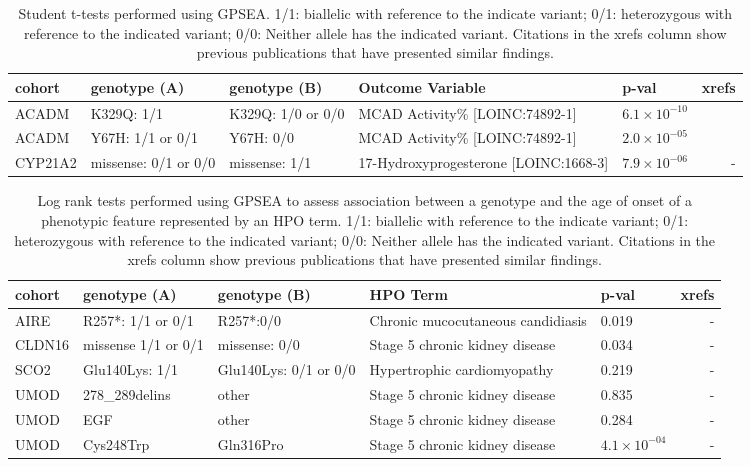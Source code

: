 \documentclass[12pt]{article}
\begin{document}
\begin{table}
\centering
\begin{tabular}{lp{2cm}p{2cm}>{\raggedright}p{4.5cm}lr}
\toprule
\textbf{cohort} & \textbf{genotype (A)} & \textbf{genotype (B)} & \textbf{Outcome Variable} & \textbf{p-val} & \textbf{xrefs}\\
\midrule
ACADM & K329Q: 1/1 & K329Q: 1/0 or 0/0 & MCAD Activity\% [LOINC:74892-1] & $6.1 \times 10^{-10}$ & \cite{PMID_33580884}\\
ACADM & Y67H: 1/1 or 0/1  & Y67H: 0/0 & MCAD Activity\% [LOINC:74892-1] & $2.0 \times 10^{-05}$ & \cite{PMID_33580884}\\
CYP21A2 & missense: 0/1 or 0/0 & missense: 1/1 & 17-Hydroxyprogesterone [LOINC:1668-3] & $7.9 \times 10^{-06}$ & -\\
\bottomrule
\end{tabular}
\caption{Student t-tests performed using GPSEA. 1/1: biallelic with reference to the indicate variant; 0/1: heterozygous with reference to the indicated variant; 0/0: Neither allele has the indicated variant.
Citations in the xrefs column show previous publications that have presented similar findings.}
\label{tab:t_test}
\end{table}

\clearpage
\newpage


\begin{table}
\centering
\begin{tabular}{lp{2cm}p{2cm}>{\raggedright}p{4.5cm}lr}
\toprule
\textbf{cohort} & \textbf{genotype (A)} & \textbf{genotype (B)} & \textbf{HPO Term} & \textbf{p-val} & \textbf{xrefs}\\
\midrule
AIRE & R257*: 1/1 or 0/1 & R257*:0/0 & Chronic mucocutaneous candidiasis & 0.019 & -\\
CLDN16 & missense 1/1 or 0/1 & missense: 0/0 & Stage 5 chronic kidney disease & 0.034 & -\\
SCO2 & Glu140Lys: 1/1 & Glu140Lys: 0/1 or 0/0 & Hypertrophic cardiomyopathy & 0.219 & -\\
UMOD & 278\_289delins & other & Stage 5 chronic kidney disease & 0.835 & -\\
UMOD & EGF & other & Stage 5 chronic kidney disease & 0.284 & -\\
UMOD & Cys248Trp & Gln316Pro & Stage 5 chronic kidney disease & $4.1 \times 10^{-04}$ & -\\
\bottomrule
\end{tabular}
\caption{Log rank tests performed using GPSEA to assess association between a genotype and the age of
    onset of a phenotypic feature represented by an HPO term. 1/1: biallelic with reference to the indicate variant; 
    0/1: heterozygous with reference to the indicated variant; 0/0: Neither allele has the indicated variant.
    Citations in the xrefs column show previous publications that have presented similar findings.}
\label{tab:to_do}
\end{table}
\clearpage
\newpage
\end{document}

